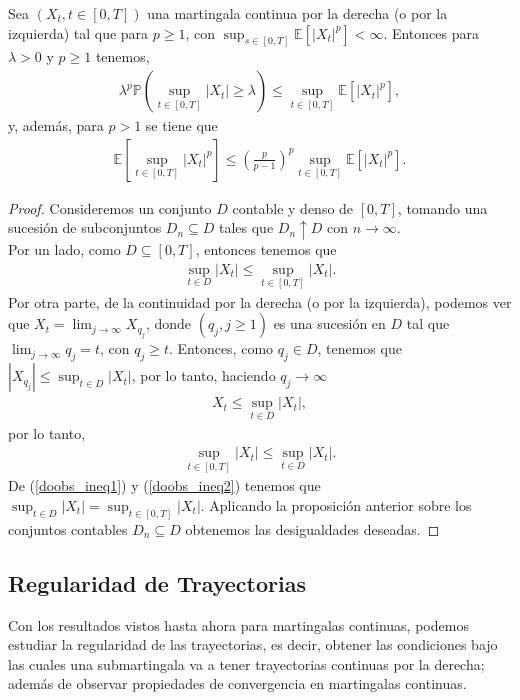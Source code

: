 \begin{theorem}
	Sea $(X_t, t\in [0, T])$ una martingala continua por la derecha (o por la izquierda) tal que para $p \geq 1$, con $\sup_{s \in [0, T]} \mathbb{E}[|X_t|^p] < \infty$. Entonces para $\lambda > 0$ y $p \geq 1$ tenemos, 
    \begin{align*}
    \lambda^p \mathbb{P} \left( \sup_{t \in [0, T]} |X_t| \geq \lambda \right)  \leq \sup_{t \in [0, T]} \mathbb{E}[|X_t|^p], 
    \end{align*}
y, además, para $p > 1$ se tiene que
	\begin{align*}
	\mathbb{E} \left[ \sup_{t \in [0, T]} |X_t|^p \right] \leq \left( \frac{p}{p-1} \right)^p \sup_{t \in [0, T]} \mathbb{E}[|X_t|^p].
	\end{align*}
\end{theorem}
\begin{proof}
	Consideremos un conjunto $D$ contable y denso de $[0, T]$, tomando una sucesión de subconjuntos $D_n \subseteq D$ tales que $D_n \uparrow D$ con $n \rightarrow \infty$. \\
    
    Por un lado, como $D \subseteq [0, T]$, entonces tenemos que
    \begin{align}
	\sup_{t \in D} |X_t| \leq \sup_{t \in [0, T]} |X_t|. \label{doobs_ineq1}
	\end{align}
    Por otra parte, de la continuidad por la derecha (o por la izquierda), podemos ver que $X_t = \lim_{j \rightarrow \infty} X_{q_j}$, donde $(q_j, j \geq 1)$ es una sucesión en $D$ tal que $\lim_{j \rightarrow \infty} q_j = t$, con $q_j \geq t$. Entonces, como $q_j \in D$, tenemos que $|X_{q_j}| \leq \sup_{t \in D} |X_t|$, por lo tanto, haciendo $q_j \rightarrow \infty$
    \begin{align*}
	X_t \leq \sup_{t \in D} |X_t|,
	\end{align*}
    por lo tanto, 
    \begin{align}
	\sup_{t \in [0, T]} |X_t| \leq \sup_{t \in D} |X_t|. \label{doobs_ineq2}
	\end{align}
    De (\ref{doobs_ineq1}) y (\ref{doobs_ineq2}) tenemos que $\sup_{t \in D} |X_t| = \sup_{t \in [0, T]} |X_t|$. Aplicando la proposición anterior sobre los conjuntos contables $D_n \subseteq D$ obtenemos las desigualdades deseadas.
\end{proof}

\subsection{Regularidad de Trayectorias}
Con los resultados vistos hasta ahora para martingalas continuas, podemos estudiar la regularidad de las trayectorias, es decir, obtener las condiciones bajo las cuales una submartingala va a tener trayectorias continuas por la derecha; además de observar propiedades de convergencia en martingalas continuas. \\

